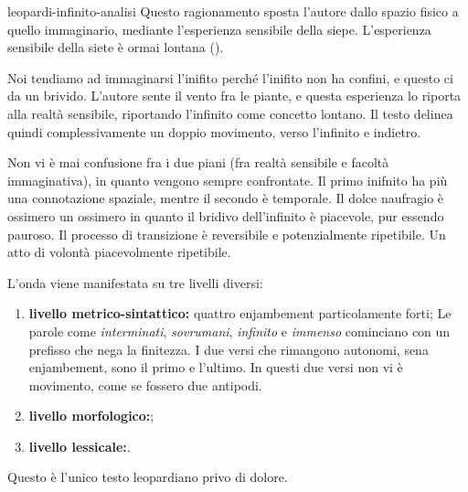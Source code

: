 \documentclass[preview]{standalone}
\begin{document}
\begin{snippet}{leopardi-infinito-analisi}
    Questo ragionamento sposta l'autore dallo spazio fisico a quello immaginario,
    mediante l'esperienza sensibile della siepe.
    L'esperienza sensibile della siete è ormai lontana ().

    Noi tendiamo ad immaginarsi l'inifito perché l'inifito non ha confini, e questo ci da un brivido.
    L'autore sente il vento fra le piante, e questa esperienza lo riporta
    alla realtà sensibile, riportando l'infinito come concetto lontano.
    Il testo delinea quindi complessivamente un doppio movimento,
    verso l'infinito e indietro.

    Non vi è mai confusione fra i due piani (fra realtà sensibile e facoltà immaginativa), in quanto
    vengono sempre confrontate.
    Il primo inifnito ha più una connotazione spaziale, mentre il secondo
    è temporale.
    Il dolce naufragio è ossimero un ossimero in quanto
    il bridivo dell'infinito è piacevole, pur essendo pauroso.
    Il processo di transizione è reversibile e potenzialmente ripetibile.
    Un atto di volontà piacevolmente ripetibile.

    L'onda viene manifestata su tre livelli diversi:
    \begin{enumerate}
        \item \textbf{livello metrico-sintattico:} quattro enjambement particolamente forti;
            Le parole come \textit{interminati}, \textit{sovrumani}, \textit{infinito} e \textit{immenso}
            cominciano con un prefisso che nega la finitezza.
            I due versi che rimangono autonomi, sena enjambement,
            sono il primo e l'ultimo.
            In questi due versi non vi è movimento, come se fossero due antipodi.
        \item \textbf{livello morfologico:};
        \item \textbf{livello lessicale:}.
    \end{enumerate}

    Questo è l'unico testo leopardiano privo di dolore.
\end{snippet}
\end{document}
